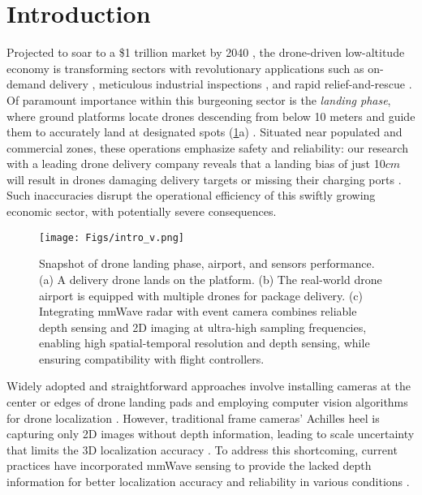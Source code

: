 \vspace{-0.8cm}
\section{Introduction}

Projected to soar to a \$1 trillion market by 2040 \cite{low_altitude_eco}, the drone-driven low-altitude economy is transforming sectors with revolutionary applications such as on-demand delivery \cite{wang2022micnest, chen2024ddl, chen2022deliversense}, meticulous industrial inspections \cite{xu2022swarmmap, li2024quest, xu2019vehicle, liu2024mobiair}, and rapid relief-and-rescue \cite{zhang2023rf, chi2022wi, chen2024soscheduler}. 
Of paramount importance within this burgeoning sector is the \textit{landing phase}, where ground platforms locate drones descending from below 10 meters and guide them to accurately land at designated spots (\fig\ref{intro}a) \cite{he2023acoustic, sun2022aim}.
Situated near populated and commercial zones, these operations emphasize safety and reliability: our research with a leading drone delivery company reveals that a landing bias of just 10$cm$ will result in drones damaging delivery targets or missing their charging ports \cite{gonzalez2021visual}. 
Such inaccuracies disrupt the operational efficiency of this swiftly growing economic sector, with potentially severe consequences.

\begin{figure}[t]
    \setlength{\abovecaptionskip}{0.25cm} %
    \setlength{\belowcaptionskip}{-0.3cm}
    \setlength{\subfigcapskip}{-0.5cm}
    \centering
        \texttt{[image: Figs/intro\_v.png]}
        \vspace{-0.2cm}
    \caption{Snapshot of drone landing phase, airport, and sensors performance. \textnormal{(a) A delivery drone lands on the platform. (b) The real-world drone airport is equipped with multiple drones for package delivery. 
    (c) Integrating mmWave radar with event camera combines reliable depth sensing and 2D imaging at ultra-high sampling frequencies, enabling high spatial-temporal resolution and depth sensing, while ensuring compatibility with flight controllers.}}
    \label{intro}
\end{figure} 

Widely adopted and straightforward approaches involve installing cameras at the center or edges of drone landing pads and employing computer vision algorithms for drone localization \cite{li2018real,xia2023anemoi,zhang2019eye}.
However, traditional frame cameras' Achilles heel is capturing only 2D images without depth information, leading to scale uncertainty that limits the 3D localization accuracy \cite{zhang2022mobidepth,xie2023mozart,10.1145/3517260}.
To address this shortcoming, current practices have incorporated mmWave sensing to provide the lacked depth information for better localization accuracy and reliability in various conditions \cite{deng2022geryon, lu2020smokerobustindoormapping,zhang2023mmhawkeye, sie2023batmobility, iizuka2023millisign, lu2020see, lu2020milliego}.

